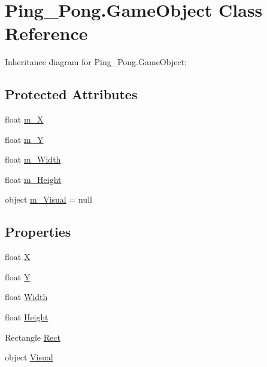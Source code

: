 \hypertarget{class_ping___pong_1_1_game_object}{}\section{Ping\+\_\+\+Pong.\+Game\+Object Class Reference}
\label{class_ping___pong_1_1_game_object}


Inheritance diagram for Ping\+\_\+\+Pong.\+Game\+Object\+:
\subsection*{Protected Attributes}
\begin{DoxyCompactItemize}
\item 
float \hyperlink{class_ping___pong_1_1_game_object_a292627bfcfe03c2f5a1dc403faa37690}{m\+\_\+X}
\item 
float \hyperlink{class_ping___pong_1_1_game_object_a29466cb57b6ac26e58052b2517083745}{m\+\_\+Y}
\item 
float \hyperlink{class_ping___pong_1_1_game_object_ac75ebfdec034a75ed71dbf91eface23f}{m\+\_\+\+Width}
\item 
float \hyperlink{class_ping___pong_1_1_game_object_a22de23272c1b02fb7bf7b13da7804afb}{m\+\_\+\+Height}
\item 
object \hyperlink{class_ping___pong_1_1_game_object_a5009be35d8fba10d72173a954caef57c}{m\+\_\+\+Visual} = null
\end{DoxyCompactItemize}
\subsection*{Properties}
\begin{DoxyCompactItemize}
\item 
float \hyperlink{class_ping___pong_1_1_game_object_ada20bb1f95db380d4c1af7c2030b0c1b}{X}
\item 
float \hyperlink{class_ping___pong_1_1_game_object_adf561c4e05f7c2f4032d8302e01a3967}{Y}
\item 
float \hyperlink{class_ping___pong_1_1_game_object_a828f5327d84be8a61d48534b2dc39e92}{Width}
\item 
float \hyperlink{class_ping___pong_1_1_game_object_a66385f8db21929ffb9fa7f180db54f95}{Height}
\item 
Rectangle \hyperlink{class_ping___pong_1_1_game_object_a2f69360b5ba37b1ebb3cc324244060c2}{Rect}
\item 
object \hyperlink{class_ping___pong_1_1_game_object_ab7e73702e83fa5d455e191551fe86b22}{Visual}
\end{DoxyCompactItemize}


